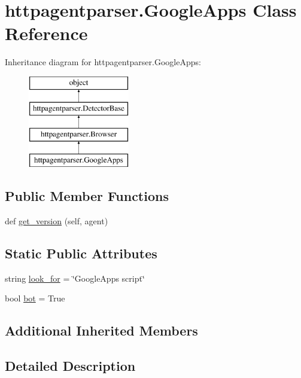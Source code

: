 \hypertarget{classhttpagentparser_1_1_google_apps}{}\section{httpagentparser.\+Google\+Apps Class Reference}
\label{classhttpagentparser_1_1_google_apps}
Inheritance diagram for httpagentparser.\+Google\+Apps\+:\begin{figure}[H]
\begin{center}
\leavevmode
\includegraphics[height=4.000000cm]{classhttpagentparser_1_1_google_apps}
\end{center}
\end{figure}
\subsection*{Public Member Functions}
\begin{DoxyCompactItemize}
\item 
def \hyperlink{classhttpagentparser_1_1_google_apps_a832b312372335026855c86b9f670eb1e}{get\+\_\+version} (self, agent)
\end{DoxyCompactItemize}
\subsection*{Static Public Attributes}
\begin{DoxyCompactItemize}
\item 
string \hyperlink{classhttpagentparser_1_1_google_apps_a30b409fc11397ff71fe1971aabf40ac5}{look\+\_\+for} = \char`\"{}Google\+Apps script\char`\"{}
\item 
bool \hyperlink{classhttpagentparser_1_1_google_apps_a5e9358957e0c7819ee710611a286c3a0}{bot} = True
\end{DoxyCompactItemize}
\subsection*{Additional Inherited Members}


\subsection{Detailed Description}


